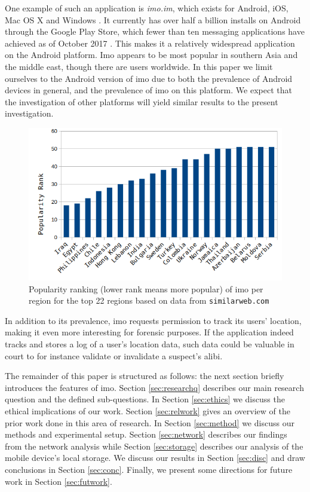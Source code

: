 \documentclass[conference]{IEEEtran}
\begin{document}
One example of such an application is {\it imo.im}, which exists for Android,
iOS, Mac OS X and Windows \cite{imo}. It currently has over half a billion
installs on Android through the Google Play Store, which fewer than ten
messaging applications have achieved as of October 2017
\cite{wiki-gplay-popular}. This makes it a relatively widespread application on
the Android platform. Imo appears to be most popular in southern Asia and the
middle east, though there are users worldwide. In this paper we limit ourselves
to the Android version of imo due to both the prevalence of Android devices in
general, and the prevalence of imo on this platform. We expect that the
investigation of other platforms will yield similar results to the present
investigation.

\begin{figure}
	\includegraphics[width=\linewidth]{pop.png}
	\caption{Popularity ranking (lower rank means more popular) of imo per region for the top 22 regions based on data from \texttt{similarweb.com}}
	\label{fig:pop}
\end{figure}

In addition to its prevalence, imo requests permission to track its users'
location, making it even more interesting for forensic purposes. If the
application indeed tracks and stores a log of a user's location data, such data
could be valuable in court to for instance validate or invalidate a suspect's
alibi.

The remainder of this paper is structured as follows: the next section briefly
introduces the features of imo. Section \ref{sec:researchq} describes our main
research question and the defined sub-questions. In Section \ref{sec:ethics} we
discuss the ethical implications of our work. Section \ref{sec:relwork} gives
an overview of the prior work done in this area of research. In Section
\ref{sec:method} we discuss our methods and experimental setup. Section
\ref{sec:network} describes our findings from the network analysis while
Section \ref{sec:storage} describes our analysis of the mobile device's local
storage. We discuss our results in Section \ref{sec:disc} and draw conclusions
in Section \ref{sec:conc}. Finally, we present some directions for future work
in Section \ref{sec:futwork}.
\end{document}

